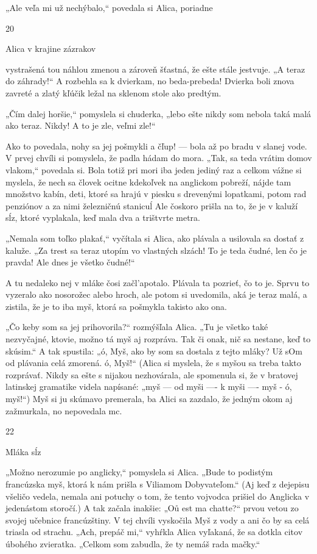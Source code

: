 \documentclass[12pt]{article}
\begin{document}
\begin{Parallel}[p]{}{}
{„Ale veľa mi už nechýbalo,“ povedala si Alica, poriadne

20

Alica v krajine zázrakov

vystrašená tou náhlou zmenou a zároveň šťastná, že ešte
stále jestvuje. „A teraz do záhrady!“ A rozbehla sa
k dvierkam, no beda-prebeda! Dvierka boli znova zavreté
a zlatý kľúčik ležal na sklenom stole ako predtým.

„Čím dalej horšie,“ pomyslela si chuderka, „lebo ešte
nikdy som nebola taká malá ako teraz. Nikdy! A to je zle,
veľmi zle!“

Ako to povedala, nohy sa jej pošmykli a čľup! — bola až
po bradu v slanej vode. V prvej chvíli si pomyslela, že padla
hádam do mora. „Tak, sa teda vrátim domov vlakom,“
povedala si. Bola totiž pri mori iba jeden jediný raz a celkom
vážne si myslela, že nech sa človek ocitne kdekoľvek na
anglickom pobreží, nájde tam množstvo kabín, deti, ktoré sa
hrajú v piesku s drevenými lopatkami, potom rad penziónov
a za nimi železničnú stanicuĺ Ale čoskoro prišla na to, že je
v kaluží sĺz, ktoré vyplakala, keď mala dva a trištvrte
metra.

„Nemala som toľko plakať,“ vyčítala si Alica, ako plávala
a usilovala sa dostať z kaluže. „Za trest sa teraz utopím vo
vlastných slzách! To je teda čudné, len čo je pravda! Ale
dnes je všetko čudné!“

A tu nedaleko nej v mláke čosi začl'apotalo. Plávala ta
pozrieť, čo to je. Sprvu to vyzeralo ako nosorožec alebo
hroch, ale potom si uvedomila, aká je teraz malá, a zistila,
že je to iba myš, ktorá sa pošmykla takisto ako ona.

„Čo keby som sa jej prihovorila?“ rozmýšľala Alica. „Tu
je všetko také nezvyčajné, ktovie, možno tá myš aj rozpráva.
Tak či onak, nič sa nestane, keď to skúsim.“ A tak spustila:
„ó, Myš, ako by som sa dostala z tejto mláky? Už sOm od
plávania celá zmorená. ó, Myš!“ (Alica si myslela, že
s myšou sa treba takto rozprávať. Nikdy sa ešte s nijakou
nezhovárala, ale spomenula si, že v bratovej latinskej
gramatike videla napísané: „myš — od myši —- k myši —- myš
- ó, myš!“) Myš si ju skúmavo premerala, ba Alici sa
zazdalo, že jedným okom aj zažmurkala, no nepovedala
mc.

22

Mláka sĺz

„Možno nerozumie po anglicky,“ pomyslela si Alica.
„Bude to podistým francúzska myš, ktorá k nám prišla
s Viliamom Dobyvateľom.“ (Aj keď z dejepisu všeličo
vedela, nemala ani potuchy o tom, že tento vojvodca prišiel
do Anglicka v jedenástom storočí.) A tak začala inakšie:
„Oů est ma chatte?“ prvou vetou zo svojej učebnice
francúzštiny. V tej chvíli vyskočila Myš z vody a ani čo by sa
celá triasla od strachu. „Ach, prepáč mi,“ vyhŕkla Alica
vyľakaná, že sa dotkla citov úbohého zvieratka. „Celkom
som zabudla, že ty nemáš rada mačky.“

}
\end{Parallel}
\end{document}
